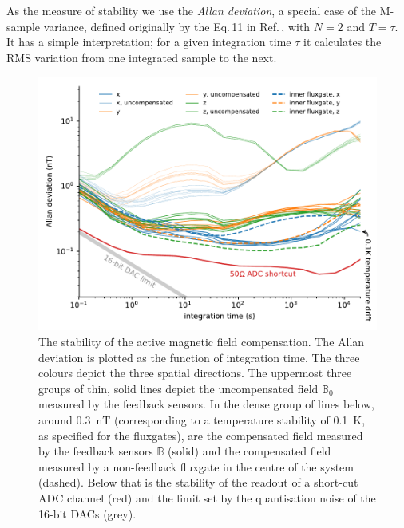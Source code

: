 As the measure of stability we use the \emph{Allan deviation}, a special case of the M-sample variance, defined originally by the Eq.\,11 in Ref.\,\cite{Allan1966}, with $N=2$ and $T = \tau$.
It has a simple interpretation; for a given integration time $\tau$ it calculates the RMS variation from one integrated sample to the next.

\begin{figure}
  \centering
  \includegraphics[width=\linewidth]{gfx/prototype/run8_field_stability.pdf}
  \caption{The stability of the active magnetic field compensation.
  The Allan deviation is plotted as the function of integration time.
  The three colours depict the three spatial directions.
  The uppermost three groups of thin, solid lines depict the uncompensated field $\mathbb{B}_0$ measured by the feedback sensors.
  In the dense group of lines below, around \SI{0.3}{\nano\tesla} (corresponding to a temperature stability of \SI{0.1}{\kelvin}, as specified for the fluxgates), are
  the compensated field measured by the feedback sensors $\mathbb{B}$ (solid) and the compensated field measured by a non-feedback fluxgate in the centre of the system (dashed).
  Below that is the stability of the readout of a short-cut ADC channel (red) and the limit set by the quantisation noise of the 16-bit DACs (grey). }\label{fig:prototype_stability}
\end{figure}

